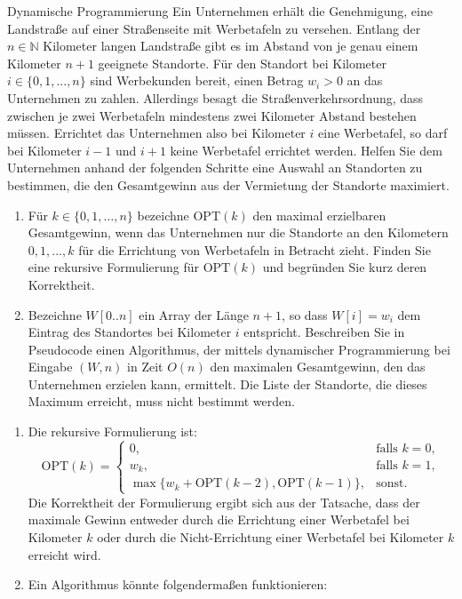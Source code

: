 \documentclass{article}
\begin{document}
\begin{exercise}{Dynamische Programmierung}
  Ein Unternehmen erhält die Genehmigung, eine Landstraße auf einer Straßenseite mit Werbetafeln zu versehen. Entlang der $n \in \mathbb{N}$ Kilometer langen Landstraße gibt es im Abstand von je genau einem Kilometer $n + 1$ geeignete Standorte. Für den Standort bei Kilometer $i \in \{0,1,...,n\}$ sind Werbekunden bereit, einen Betrag $w_i > 0$ an das Unternehmen zu zahlen. Allerdings besagt die Straßenverkehrsordnung, dass zwischen je zwei Werbetafeln mindestens zwei Kilometer Abstand bestehen müssen. Errichtet das Unternehmen also bei Kilometer $i$ eine Werbetafel, so darf bei Kilometer $i - 1$ und $i + 1$ keine Werbetafel errichtet werden. Helfen Sie dem Unternehmen anhand der folgenden Schritte eine Auswahl an Standorten zu bestimmen, die den Gesamtgewinn aus der Vermietung der Standorte maximiert.
  \begin{enumerate}
    \item Für $k \in \{0, 1, \dots, n\}$ bezeichne $\text{OPT}(k)$ den maximal erzielbaren Gesamtgewinn, wenn das Unternehmen nur die Standorte an den Kilometern $0,1,...,k$ für die Errichtung von Werbetafeln in Betracht zieht. Finden Sie eine rekursive Formulierung für $\text{OPT}(k)$ und begründen Sie kurz deren Korrektheit.
    \item Bezeichne $W[0..n]$ ein Array der Länge $n + 1$, so dass $W[i] = w_i$ dem Eintrag des Standortes bei Kilometer $i$ entspricht. Beschreiben Sie in Pseudocode einen Algorithmus, der mittels dynamischer Programmierung bei Eingabe $(W, n)$ in Zeit $O(n)$ den maximalen Gesamtgewinn, den das Unternehmen erzielen kann, ermittelt. Die Liste der Standorte, die dieses Maximum erreicht, muss nicht bestimmt werden.
  \end{enumerate}

  \begin{solution}
    \begin{enumerate}
      \item Die rekursive Formulierung ist: \[
              \text{OPT}(k) = \begin{cases}
                0,                                              & \text{falls } k = 0, \\
                w_k,                                            & \text{falls } k = 1, \\
                \max\{w_k + \text{OPT}(k-2), \text{OPT}(k-1)\}, & \text{sonst}.
              \end{cases}
            \]
            Die Korrektheit der Formulierung ergibt sich aus der Tatsache, dass der maximale Gewinn entweder durch die Errichtung einer Werbetafel bei Kilometer $k$ oder durch die Nicht-Errichtung einer Werbetafel bei Kilometer $k$ erreicht wird.
      \item Ein Algorithmus könnte folgendermaßen funktionieren: 
    \end{enumerate}
  \end{solution}
\end{exercise}
\end{document}
